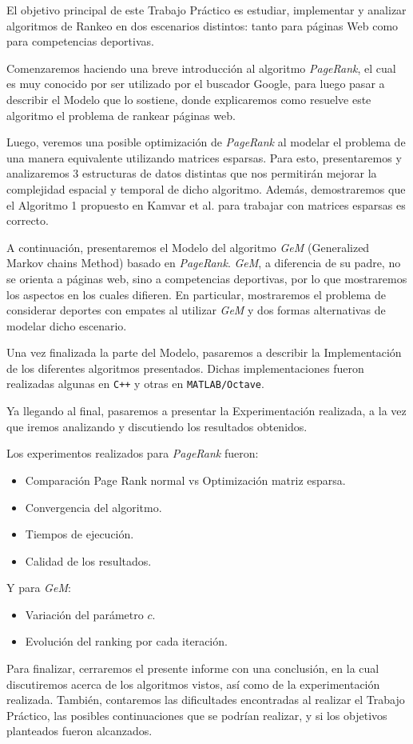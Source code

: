  El objetivo principal de este Trabajo Práctico es estudiar, implementar y analizar
 algoritmos de Rankeo en dos escenarios distintos: tanto para páginas Web como para
 competencias deportivas.

Comenzaremos haciendo una breve introducción al algoritmo \textit{PageRank}, el cual
es muy conocido por ser utilizado por el buscador Google,
 para luego pasar a describir el Modelo que lo sostiene,
donde explicaremos como resuelve este algoritmo el problema de rankear
páginas web.

Luego, veremos una posible optimización de \textit{PageRank} al modelar
el problema de una manera equivalente utilizando matrices esparsas. Para esto,
presentaremos y analizaremos 3 estructuras de datos distintas que nos permitirán mejorar la
complejidad espacial y temporal de dicho algoritmo. Además, demostraremos que el Algoritmo 1 propuesto en Kamvar et al.\cite{Kamvar2003}
para trabajar con matrices esparsas es correcto.

A continuación, presentaremos el Modelo del algoritmo \textit{GeM} (Generalized Markov chains Method) basado en
\textit{PageRank}. \textit{GeM}, a diferencia de su padre, no se orienta a páginas web, sino a competencias
deportivas, por lo que mostraremos los aspectos en los cuales difieren.
En particular, mostraremos el problema de considerar deportes con empates al utilizar \textit{GeM} y dos formas
alternativas de modelar dicho escenario.

Una vez finalizada la parte del Modelo, pasaremos a describir la Implementación de los
diferentes algoritmos presentados. Dichas implementaciones fueron realizadas algunas en
\texttt{C++} y otras en \texttt{MATLAB/Octave}.

Ya llegando al final, pasaremos a presentar la Experimentación realizada, a la vez
que iremos analizando y discutiendo los resultados obtenidos.

Los experimentos realizados para \textit{PageRank} fueron:
\begin{itemize}
    \item Comparación Page Rank normal vs Optimización matriz esparsa.
    \item Convergencia del algoritmo.
    \item Tiempos de ejecución.
    \item Calidad de los resultados.
\end{itemize}

Y para \textit{GeM}:
\begin{itemize}
    \item Variación del parámetro $c$.
    \item Evolución del ranking por cada iteración.
\end{itemize}

Para finalizar, cerraremos el presente informe con una conclusión, en la cual
discutiremos acerca de los algoritmos vistos, así como de la experimentación realizada.
También, contaremos las dificultades encontradas al realizar el Trabajo Práctico,
las posibles continuaciones que se podrían realizar, y si los objetivos planteados
fueron alcanzados.
